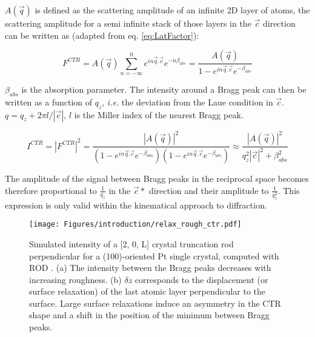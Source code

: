 $A(\vec{q})$ is defined as the scattering amplitude of an infinite 2D layer of atoms, the scattering amplitude for a semi infinite stack of those layers in the $\vec{c}$ direction can be written as (adapted from eq. \ref{eq:LatFactor}):

\begin{equation}
    \label{eq:CTR1}
    F^{CTR} = A(\vec{q})\sum_{n=-\infty}^0 e^{in\vec{q}.\vec{c}} e^{-n\beta_{abs}} = \frac{A(\vec{q})}{1 - e^{in\vec{q}.\vec{c}} e^{-\beta_{abs}}}
\end{equation}

$\beta_{abs}$ is the absorption parameter.
The intensity around a Bragg peak can then be written as a function of $q_z$, \textit{i.e.} the deviation from the Laue condition in $\vec{c}$.
$q = q_z + 2\pi l/|\vec{c}|$, $l$ is the Miller index of the nearest Bragg peak.

\begin{equation}
    \label{eq:CTR2}
    I^{CTR} = |F^{CTR}|^2 = \frac{|A(\vec{q})|^2}{(1 - e^{in\vec{q}.\vec{c}} e^{-\beta_{abs}})(1 - e^{in\vec{q}.\vec{c}} e^{-\beta_{abs}})} \approx \frac{|A(\vec{q})|^2}{q_z^2 |\vec{c}|^2 + \beta_{abs}^2 }
\end{equation}

The amplitude of the signal between Bragg peaks in the reciprocal space becomes therefore proportional to $\frac{1}{q_z}$ in the $\vec{c}*$ direction and their amplitude to $\frac{1}{q_z^2}$.
This expression is only valid within the kinematical approach to diffraction.

\begin{figure}[!htb]
    \centering
    \texttt{[image: Figures/introduction/relax\_rough\_ctr.pdf]}
    \caption{
    Simulated intensity of a [2, 0, L] crystal truncation rod perpendicular for a (100)-oriented Pt single crystal, computed with ROD \parencite{Vlieg2000}.
    (a) The intensity between the Bragg peaks decreases with increasing roughness.
    (b) $\delta z$ corresponds to the displacement (or surface relaxation) of the last atomic layer perpendicular to the surface.
    Large surface relaxations induce an asymmetry in the CTR shape and a shift in the position of the minimum between Bragg peaks.
    }
    \label{fig:CTRSimulation}
\end{figure}


